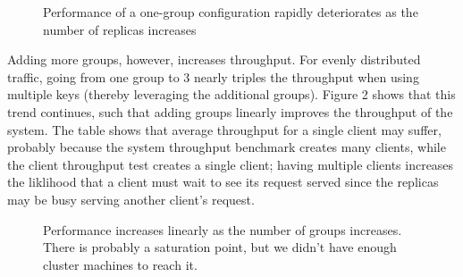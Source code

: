 \documentclass[letterpaper,10pt]{article}
\begin{document}
\begin{figure}[h]
\centering
{}
\caption{Performance of a one-group configuration rapidly deteriorates as the number of replicas increases}
\label{fig:replicas}
\end{figure}

Adding more groups, however, increases throughput.  For evenly distributed traffic, going from one group to 3 nearly triples the throughput when using multiple keys (thereby leveraging the additional groups).  Figure 2 shows that this trend continues, such that adding groups linearly improves the throughput of the system. The table shows that average throughput for a single client may suffer, probably because the system throughput benchmark creates many clients, while the client throughput test creates a single client; having multiple clients increases the liklihood that a client must wait to see its request served since the replicas may be busy serving another client's request.

\begin{figure}[h]
\centering
{}
\caption{Performance increases linearly as the number of groups increases. There is probably a saturation point, but we didn't have enough cluster machines to reach it.}
\label{fig:groups}
\end{figure}
\end{document}

